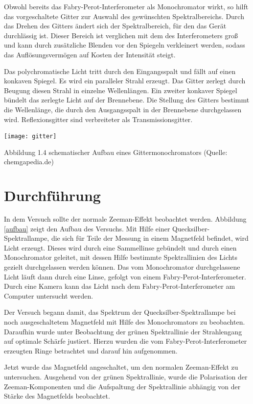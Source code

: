\documentclass[10pt,a4paper]{article}
\begin{document}
Obwohl bereits das Fabry-Perot-Interferometer als Monochromator wirkt, so hilft das vorgeschaltete Gitter zur Auswahl des gewünschten Spektralbereichs. Durch das Drehen des Gitters ändert sich der Spektralbereich, für den das Gerät durchlässig ist. Dieser Bereich ist verglichen mit dem des Interferometers groß und kann durch zusätzliche Blenden vor den Spiegeln verkleinert werden, sodass das Auflösungsvermögen auf Kosten der Intensität steigt. 

Das polychromatische Licht tritt durch den Eingangsspalt und fällt auf einen konkaven Spiegel. Es wird ein paralleler Strahl erzeugt. Das Gitter zerlegt durch Beugung diesen Strahl in einzelne Wellenlängen. Ein zweiter konkaver Spiegel bündelt das zerlegte Licht auf der Brennebene. Die Stellung des Gitters bestimmt die Wellenlänge, die durch den Ausgangsspalt in der Brennebene durchgelassen wird. Reflexionsgitter sind verbreiteter als Transmissionsgitter.

\texttt{[image: gitter]}

Abbildung 1.4 schematischer Aufbau eines Gittermonochromators (Quelle: chemgapedia.de)

\section{Durchführung}

In dem Versuch sollte der normale Zeeman-Effekt beobachtet werden. Abbildung \ref{aufbau} zeigt den Aufbau des Versuchs. Mit Hilfe einer Quecksilber-Spektrallampe, die sich für Teile der Messung in einem Magnetfeld befindet, wird Licht erzeugt. Dieses wird durch eine Sammellinse gebündelt und durch einen Monochromator geleitet, mit dessen Hilfe bestimmte Spektrallinien des Lichts gezielt durchgelassen werden können. Das vom Monochromator durchgelassene Licht läuft dann durch eine Linse, gefolgt von einem Fabry-Perot-Interferometer. Durch eine Kamera kann das Licht nach dem Fabry-Perot-Interferometer am Computer untersucht werden. 

Der Versuch begann damit, das Spektrum der Quecksilber-Spektrallampe bei noch ausgeschaltetem Magnetfeld mit Hilfe des Monochromators zu beobachten. Daraufhin wurde unter Beobachtung der grünen Spektrallinie der Strahlengang auf optimale Schärfe justiert. Hierzu wurden die vom Fabry-Perot-Interferometer erzeugten Ringe betrachtet und darauf hin aufgenommen.

Jetzt wurde das Magnetfeld angeschaltet, um den normalen Zeeman-Effekt zu untersuchen. Ausgehend von der grünen Spektrallinie, wurde die Polarisation der Zeeman-Komponenten und die Aufspaltung der Spektrallinie abhängig von der Stärke des Magnetfelds beobachtet.
\end{document}

